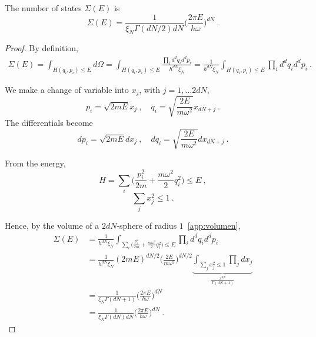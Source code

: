     The number of states $\Sigma(E)$ is 
    \begin{equation*}
        \Sigma(E) = \frac{1}{\xi_N \Gamma(dN/2) d N} \Big ( \frac{2 \pi E}{h \omega}\Big)^{dN} ~.
    \end{equation*}
    \begin{proof}
        By definition, 
        \begin{equation*}
        \begin{aligned}
            \Sigma (E) = \int_{H (q_i, p_i) \leq E} d\Omega = \int_{H (q_i, p_i) \leq E} \frac{\prod_i d^d q_i d^d p_i}{h^{dN} \xi_N} = \frac{1}{h^{dN} \xi_N} \int_{H (q_i, p_i) \leq E} \prod_i d^d q_i d^d p_i ~.
        \end{aligned}
        \end{equation*}

        We make a change of variable into $x_j$, with $j = 1, \ldots 2dN$,
        \begin{equation*}
            p_i = \sqrt{2mE} x_j ~, \quad q_i = \sqrt{\frac{2E}{m\omega^2}} x_{dN + j} ~.
        \end{equation*}
        The differentials become 
        \begin{equation*}
            d p_i = \sqrt{2mE} dx_j  ~, \quad d q_i = \sqrt{\frac{2E}{m\omega^2}} d x_{dN + j} ~.
        \end{equation*}

        From the energy,
        \begin{equation*}
            H = \sum_i \Big ( \frac{p^2_i}{2m} + \frac{m \omega^2}{2} q_i^2 \Big )  \leq E ~,
        \end{equation*}
        \begin{equation*}
            \sum_j x^2_j \leq 1 ~.
        \end{equation*}

        Hence, by the volume of a $2dN$-sphere of radius $1$~\eqref{app:volumen},
        \begin{equation*}
        \begin{aligned}
            \Sigma (E) & = \frac{1}{h^{dN} \xi_N} \int_{\sum_i \Big ( \frac{p^2_i}{2m} + \frac{m \omega^2}{2} q_i^2 \Big ) \leq E} \prod_i d^d q_i d^d p_i \\ & = \frac{1}{h^{dN} \xi_N} (2mE)^{dN/2} \Big (\frac{2E}{m\omega^2} \Big )^{dN/2} \underbrace{\int_{\sum_j x^2_j \leq 1} \prod_j d x_j}_{ \frac{\pi^{dN}}{\Gamma (dN + 1)}} \\ & = \frac{1}{\xi_N \Gamma (dN + 1)} \Big (\frac{2 \pi E}{h \omega} \Big )^{dN} \\ & = \frac{1}{\xi_N \Gamma (dN) dN} \Big (\frac{2 \pi E}{h \omega} \Big )^{dN} ~.
        \end{aligned}
        \end{equation*}
    \end{proof}

